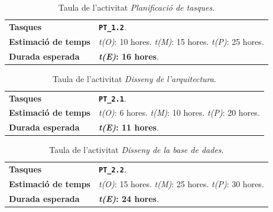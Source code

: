 \documentclass[a4paper,12pt]{ThesisStyle}
\begin{document}
\begin{table}[H]
  \begin{tabularx}{\textwidth}{l | X}
    \toprule
    \rowcolor{Gray}
    \multicolumn{2}{c}{\texttt{\textbf{A2:}} Planificació de tasques}\\
    \midrule[0.9pt]
    \textbf{Tasques}                 & \texttt{\textbf{PT\_1.2}}.\\
    \midrule
    \textbf{Estimació de temps}      & \textit{t(O)}: 10 hores.
    \newline \textit{t(M)}: 15 hores.
    \newline \textit{t(P)}: 25 hores.\\
    \midrule
    \textbf{Durada esperada}         & \textbf{\textit{t(E)}: 16 hores}.\\
    \bottomrule
  \end{tabularx}
  \caption{\label{taula:a2} Taula de l'activitat \emph{Planificació de tasques}.}
\end{table}

\begin{table}[H]
  \begin{tabularx}{\textwidth}{l | X}
    \toprule
    \rowcolor{Green}
    \multicolumn{2}{c}{\texttt{\textbf{A3:}} Disseny de l'arquitectura}\\
    \midrule[0.9pt]
    \textbf{Tasques}                 & \texttt{\textbf{PT\_2.1}}.\\
    \midrule
    \textbf{Estimació de temps}      & \textit{t(O)}: 6 hores.
    \newline \textit{t(M)}: 10 hores.
    \newline \textit{t(P)}: 20 hores.\\
    \midrule
    \textbf{Durada esperada}         & \textbf{\textit{t(E)}: 11 hores}.\\
    \bottomrule
  \end{tabularx}
  \caption{\label{taula:a3} Taula de l'activitat \emph{Disseny de l'arquitectura}.}
\end{table}

\begin{table}[H]
  \begin{tabularx}{\textwidth}{l | X}
    \toprule
    \rowcolor{Green}
    \multicolumn{2}{c}{\texttt{\textbf{A4:}} Disseny de la base de dades}\\
    \midrule[0.9pt]
    \textbf{Tasques}                 & \texttt{\textbf{PT\_2.2}}.\\
    \midrule
    \textbf{Estimació de temps}      & \textit{t(O)}: 15 hores.
    \newline \textit{t(M)}: 25 hores.
    \newline \textit{t(P)}: 30 hores.\\
    \midrule
    \textbf{Durada esperada}         & \textbf{\textit{t(E)}: 24 hores}.\\
    \bottomrule
  \end{tabularx}
  \caption{\label{taula:a4} Taula de l'activitat \emph{Disseny de la base de dades}.}
\end{table}
\end{document}

